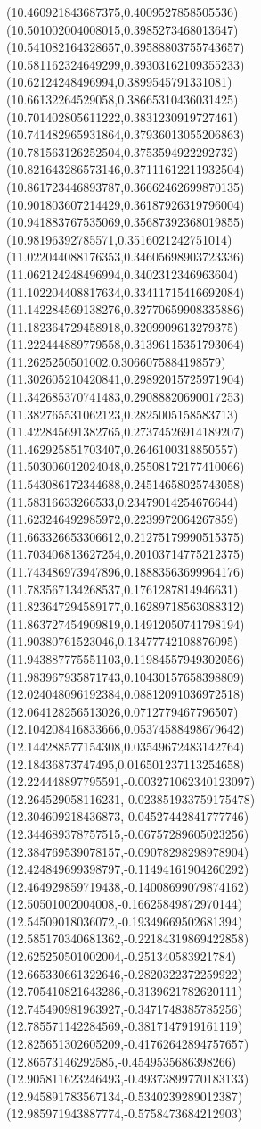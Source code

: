 {(10.460921843687375,0.4009527858505536)
(10.501002004008015,0.3985273468013647)
(10.541082164328657,0.39588803755743657)
(10.581162324649299,0.39303162109355233)
(10.62124248496994,0.3899545791331081)
(10.66132264529058,0.38665310436031425)
(10.701402805611222,0.3831230919727461)
(10.741482965931864,0.37936013055206863)
(10.781563126252504,0.3753594922292732)
(10.821643286573146,0.37111612211932504)
(10.861723446893787,0.36662462699870135)
(10.901803607214429,0.36187926319796004)
(10.941883767535069,0.35687392368019855)
(10.98196392785571,0.3516021242751014)
(11.022044088176353,0.34605698903723336)
(11.062124248496994,0.3402312346963604)
(11.102204408817634,0.33411715416692084)
(11.142284569138276,0.32770659908335886)
(11.182364729458918,0.3209909613279375)
(11.222444889779558,0.31396115351793064)
(11.2625250501002,0.3066075884198579)
(11.302605210420841,0.29892015725971904)
(11.342685370741483,0.29088820690017253)
(11.382765531062123,0.2825005158583713)
(11.422845691382765,0.27374526914189207)
(11.462925851703407,0.2646100318850557)
(11.503006012024048,0.25508172177410066)
(11.543086172344688,0.24514658025743058)
(11.58316633266533,0.23479014254676644)
(11.623246492985972,0.2239972064267859)
(11.663326653306612,0.21275179990515375)
(11.703406813627254,0.20103714775212375)
(11.743486973947896,0.18883563699964176)
(11.783567134268537,0.1761287814946631)
(11.823647294589177,0.16289718563088312)
(11.863727454909819,0.14912050741798194)
(11.90380761523046,0.13477742108876095)
(11.943887775551103,0.11984557949302056)
(11.983967935871743,0.10430157658398809)
(12.024048096192384,0.08812091036972518)
(12.064128256513026,0.0712779467796507)
(12.104208416833666,0.05374588498679642)
(12.144288577154308,0.03549672483142764)
(12.18436873747495,0.016501237113254658)
(12.224448897795591,-0.003271062340123097)
(12.264529058116231,-0.023851933759175478)
(12.304609218436873,-0.04527442841777746)
(12.344689378757515,-0.06757289605023256)
(12.384769539078157,-0.09078298298978904)
(12.424849699398797,-0.11494161904260292)
(12.464929859719438,-0.14008699079874162)
(12.50501002004008,-0.16625849872970144)
(12.54509018036072,-0.19349669502681394)
(12.585170340681362,-0.22184319869422858)
(12.625250501002004,-0.251340583921784)
(12.665330661322646,-0.2820322372259922)
(12.705410821643286,-0.3139621782620111)
(12.745490981963927,-0.3471748385785256)
(12.785571142284569,-0.3817147919161119)
(12.825651302605209,-0.41762642894757657)
(12.86573146292585,-0.4549535686398266)
(12.905811623246493,-0.49373899770183133)
(12.945891783567134,-0.5340239289012387)
(12.985971943887774,-0.5758473684212903)
}
